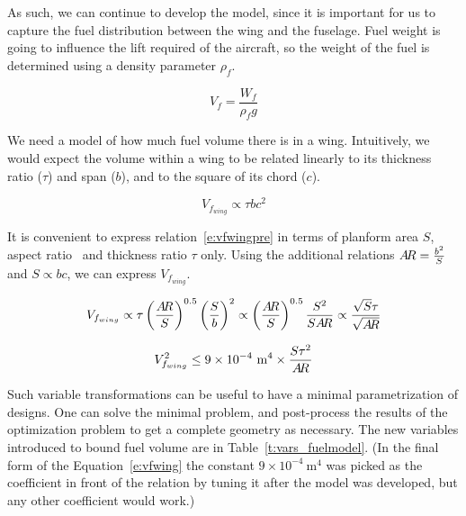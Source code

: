 As such, we can continue to develop the model, since it is important for us to
capture the fuel distribution between the wing and the fuselage. Fuel weight is going
to influence the lift required of the aircraft, so the weight of the fuel is determined
using a density parameter $\rho_{f}$. 

\begin{equation}
    V_f = \frac{W_f } {\rho_f g}
    \label{e:vf}
\end{equation}

We need a model of how much fuel volume there is in a wing. Intuitively,
we would expect the volume within a wing
to be related linearly to its thickness ratio ($\tau$) and span ($b$),
and to the square of its chord ($c$). 

\begin{equation}
	V_{f_{wing}} \propto \tau b c^2
	\label{e:vfwingpre}
\end{equation} 

It is convenient to express relation~\ref{e:vfwingpre} in terms of planform area $S$,
aspect ratio \AR~and thickness ratio $\tau$ only.
Using the additional relations $A\!R = \frac{b^2}{S}$ and $S \propto b c$, we can
express $V_{f_{wing}}$.

\begin{equation}
	V_{f_{wing}} \propto \tau \left(\frac{A\!R}{S}\right)^{0.5} \left(\frac{S}{b}\right)^2 \propto
		\left(\frac{A\!R}{S}\right)^{0.5} \frac{S^2}{S A\!R} \propto \frac{\sqrt{S}\tau}{\sqrt{A\!R}}
\end{equation}

\begin{equation}
\label{e:vfwing}
V_{f_{wing}}^2 \leq 9\times10^{-4} ~\mathrm{m}^4 \times \frac{S \tau^2}{A\!R}
\end{equation}

Such variable transformations can be useful to have a minimal parametrization of designs.
One can solve the minimal problem, and
post-process the results of the optimization problem to get a complete geometry
as necessary. The new variables introduced to bound fuel volume are in Table~\ref{t:vars_fuelmodel}.
(In the final form of the Equation~\ref{e:vfwing} the constant $9\times10^{-4}~\mathrm{m}^4$ was picked as the coefficient in
front of the relation by tuning it after the model was developed,
but any other coefficient would work.)

